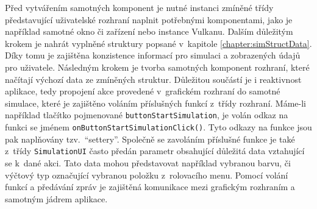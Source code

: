 Před vytvářením samotných komponent je nutné instanci zmíněné třídy představující uživatelské rozhraní naplnit potřebnými komponentami, jako je například samotné okno či zařízení nebo instance Vulkanu. Dalším důležitým krokem je nahrát vyplněné struktury popsané v~kapitole \ref{chapter:simStructData}. Díky tomu je zajištěna konzistence informací pro simulaci a zobrazených údajů pro uživatele. Následným krokem je tvorba samotných komponent rozhraní, které načítají výchozí data ze zmíněných struktur. Důležitou součástí je i reaktivnost aplikace, tedy propojení akce provedené v~grafickém rozhraní do samotné simulace, které je zajištěno voláním příslušných funkcí z~třídy rozhraní. Máme-li například tlačítko pojmenované \texttt{buttonStartSimulation}, je volán odkaz na funkci se jménem \texttt{onButtonStartSimulationClick()}. Tyto odkazy na funkce jsou pak naplňovány tzv.~\enquote{settery}. Společně se zavoláním příslušné funkce je také z~třídy \texttt{SimulationUI} často předán parametr obsahující důležitá data vztahující se k~dané akci. Tato data mohou představovat například vybranou barvu, či výčtový typ označující vybranou položku z~rolovacího menu. Pomocí volání funkcí a předávání zpráv je zajištěná komunikace mezi grafickým rozhraním a samotným jádrem aplikace.


